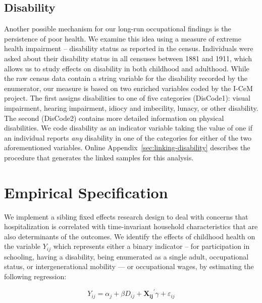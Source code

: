 \documentclass[12pt,english]{article}
\begin{document}
\subsection[Disability]{Disability\label{subsec:disability}}

Another possible mechanism for our long-run occupational findings is the persistence of poor health. We examine this idea using a measure of extreme health impairment -- disability status as reported in the census. Individuals were asked about their disability status in all censuses between 1881 and 1911, which allows us to study effects on disability in both childhood and adulthood. While the raw census data contain a string variable for the disability recorded by the enumerator, our measure is based on two enriched variables coded by the I-CeM project. The first assigns disabilities to one of five categories (DisCode1): visual impairment, hearing impairment, idiocy and imbecility, lunacy, or other disability. The second (DisCode2) contains more detailed information on physical disabilities. We code disability as an indicator variable taking the value of one if an individual reports \textit{any} disability in one of the categories for either of the two aforementioned variables. Online Appendix~\ref{sec:linking-disability} describes the procedure that generates the linked samples for this analysis.

\section[Empirical Specification]{Empirical Specification\label{sec:Empirical_Specification}}

We implement a sibling fixed effects research design to deal with concerns that hospitalization is correlated with time-invariant household characteristics that are also determinants of the outcomes. We identify the effects of childhood health on the variable $Y_{ij}$ which represents either a binary indicator -- for participation in schooling, having a disability, being enumerated as a single adult, occupational status, or intergenerational mobility --- or occupational wages, by estimating the following regression: 

\begin{equation}
    Y_{ij} = \alpha_j + \beta D_{ij} + \mathbf{X_{ij}}^{\prime}\gamma + \varepsilon_{ij} \label{eqn:HospFEWithControls}
\end{equation}
\end{document}
